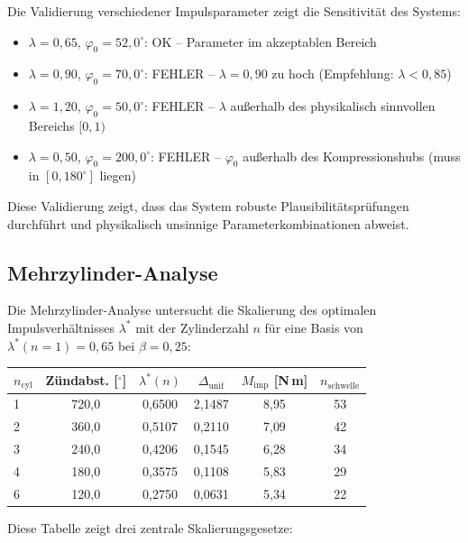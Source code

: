 ﻿\documentclass[a4paper,12pt]{article}
\begin{document}
Die Validierung verschiedener Impulsparameter zeigt die Sensitivität des Systems:

\begin{itemize}
  \item $\lambda=0{,}65$, $\varphi_0=52{,}0^\circ$: OK -- Parameter im akzeptablen Bereich
  \item $\lambda=0{,}90$, $\varphi_0=70{,}0^\circ$: FEHLER -- $\lambda = 0{,}90$ zu hoch (Empfehlung: $\lambda < 0{,}85$)
  \item $\lambda=1{,}20$, $\varphi_0=50{,}0^\circ$: FEHLER -- $\lambda$ außerhalb des physikalisch sinnvollen Bereichs $[0, 1)$
  \item $\lambda=0{,}50$, $\varphi_0=200{,}0^\circ$: FEHLER -- $\varphi_0$ außerhalb des Kompressionshubs (muss in $[0{,} 180^\circ]$ liegen)
\end{itemize}

Diese Validierung zeigt, dass das System robuste Plausibilitätsprüfungen
durchführt und physikalisch unsinnige Parameterkombinationen abweist.

\subsection{Mehrzylinder-Analyse}

Die Mehrzylinder-Analyse untersucht die Skalierung des optimalen
Impulsverhältnisses $\lambda^*$ mit der Zylinderzahl $n$ für eine Basis
von $\lambda^*(n=1) = 0{,}65$ bei $\beta = 0{,}25$:

\begin{center}
\begin{tabular}{lccccc}
\toprule
$n_\text{cyl}$ & Zündabst. [$^\circ$] & $\lambda^*(n)$ & $\Delta_\text{unif}$ & $M_\text{imp}$ [N\,m] & $n_\text{schwelle}$ \\
\midrule
1 & 720{,}0 & 0{,}6500 & 2{,}1487 & 8{,}95 & 53 \\
2 & 360{,}0 & 0{,}5107 & 0{,}2110 & 7{,}09 & 42 \\
3 & 240{,}0 & 0{,}4206 & 0{,}1545 & 6{,}28 & 34 \\
4 & 180{,}0 & 0{,}3575 & 0{,}1108 & 5{,}83 & 29 \\
6 & 120{,}0 & 0{,}2750 & 0{,}0631 & 5{,}34 & 22 \\
\bottomrule
\end{tabular}
\end{center}

Diese Tabelle zeigt drei zentrale Skalierungsgesetze:
\end{document}
